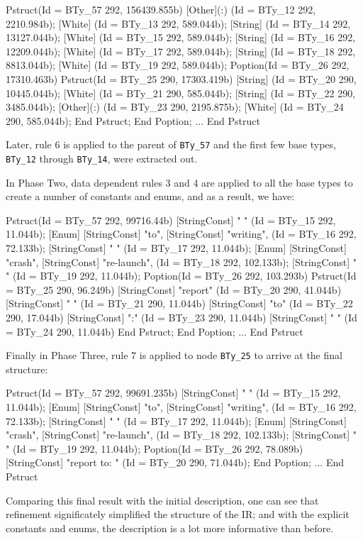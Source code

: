 \begin{code}
Pstruct(Id = BTy_57 292, 156439.855b)
  [Other](:) (Id = BTy_12 292, 2210.984b);
  [White] (Id = BTy_13 292, 589.044b);
  [String] (Id = BTy_14 292, 13127.044b);
  [White] (Id = BTy_15 292, 589.044b);
  [String] (Id = BTy_16 292, 12209.044b);
  [White] (Id = BTy_17 292, 589.044b);
  [String] (Id = BTy_18 292, 8813.044b);
  [White] (Id = BTy_19 292, 589.044b);
  Poption(Id = BTy_26 292, 17310.463b)
    Pstruct(Id = BTy_25 290, 17303.419b)
      [String] (Id = BTy_20 290, 10445.044b);
      [White] (Id = BTy_21 290, 585.044b);
      [String] (Id = BTy_22 290, 3485.044b);
      [Other](:) (Id = BTy_23 290, 2195.875b);
      [White] (Id = BTy_24 290, 585.044b);
    End Pstruct;
  End Poption;
  ...
End Pstruct
\end{code}

Later, rule 6 is applied to the parent of {\tt BTy\_57} and the first few
base types, {\tt BTy\_12} through {\tt BTy\_14}, were extracted out. 

In Phase Two, data dependent rules 3 and 4 are applied to all the base types to 
create a number of constants and enums, and as a result, 
we have:

\begin{code}
Pstruct(Id = BTy_57 292, 99716.44b)
  [StringConst] " " (Id = BTy_15 292, 11.044b);
  [Enum] {[StringConst] "to", [StringConst] "writing", } 
		(Id = BTy_16 292, 72.133b);
  [StringConst] " " (Id = BTy_17 292, 11.044b);
  [Enum] {[StringConst] "crash", [StringConst] "re-launch", } 
		(Id = BTy_18 292, 102.133b);
  [StringConst] " " (Id = BTy_19 292, 11.044b);
  Poption(Id = BTy_26 292, 103.293b)
    Pstruct(Id = BTy_25 290, 96.249b)
      [StringConst] "report" (Id = BTy_20 290, 41.044b)
      [StringConst] " " (Id = BTy_21 290, 11.044b)
      [StringConst] "to" (Id = BTy_22 290, 17.044b)
      [StringConst] ":" (Id = BTy_23 290, 11.044b)
      [StringConst] " " (Id = BTy_24 290, 11.044b)
    End Pstruct;
  End Poption;
...
End Pstruct
\end{code}

Finally in Phase Three, rule 7 is applied to node {\tt BTy\_25} to arrive at the 
final structure:
\begin{code}
Pstruct(Id = BTy_57 292, 99691.235b)
  [StringConst] " " (Id = BTy_15 292, 11.044b);
  [Enum] {[StringConst] "to", [StringConst] "writing", } 
		(Id = BTy_16 292, 72.133b);
  [StringConst] " " (Id = BTy_17 292, 11.044b);
  [Enum] {[StringConst] "crash", [StringConst] "re-launch", } 
		(Id = BTy_18 292, 102.133b);
  [StringConst] " " (Id = BTy_19 292, 11.044b);
  Poption(Id = BTy_26 292, 78.089b)
  	[StringConst] "report to: " (Id = BTy_20 290, 71.044b);
  End Poption;
  ...
End Pstruct
\end{code}

Comparing this final result with the initial description, one can see that
refinement significately simplified the structure of the IR; and with
the explicit constants and enums, the description is a lot more
informative than before.
